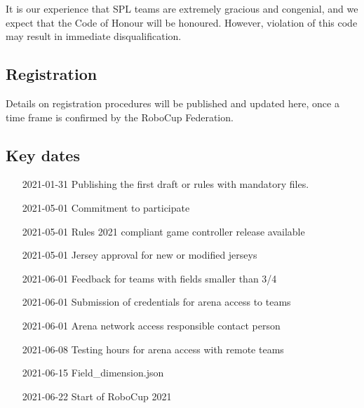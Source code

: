 It is our experience that SPL teams are extremely gracious and congenial, and we expect that the Code of Honour will be honoured. However, violation of this code may result in immediate disqualification.

\subsection{Registration}

Details on registration procedures will be published and updated here, once a time frame is confirmed by the RoboCup Federation.

\subsection{Key dates}

\begin{itemize}[leftmargin=*,labelsep=0.7cm, labelindent=2cm]
    \item [2021-01-31] Publishing the first draft or rules with mandatory files.
    \item [2021-05-01] Commitment to participate
    \item [2021-05-01] Rules 2021 compliant game controller release available
    \item [2021-05-01] Jersey approval for new or modified jerseys
    \item [2021-06-01] Feedback for teams with fields smaller than 3/4
    \item [2021-06-01] Submission of credentials for arena access to teams
    \item [2021-06-01] Arena network access responsible contact person
    \item [2021-06-08] Testing hours for arena access with remote teams
    \item [2021-06-15] Field\_dimension.json
    \item [2021-06-22] Start of RoboCup 2021
\end{itemize}
